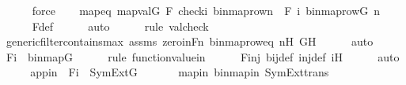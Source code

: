 \begin{isabellebody}
\ \ \ \ \isamarkupfalse%
\ force\isanewline
\isanewline
\ \ \isamarkupfalse%
\ mapeq{\isacharcolon}{\kern0pt}\ {\isachardoublequoteopen}map{\isacharparenleft}{\kern0pt}val{\isacharparenleft}{\kern0pt}G{\isacharparenright}{\kern0pt}{\isacharcomma}{\kern0pt}\ {\isacharbrackleft}{\kern0pt}F{\isacharprime}{\kern0pt}{\isacharcomma}{\kern0pt}\ check{\isacharparenleft}{\kern0pt}i{\isacharparenright}{\kern0pt}{\isacharcomma}{\kern0pt}\ binmap{\isacharunderscore}{\kern0pt}row{\isacharprime}{\kern0pt}{\isacharparenleft}{\kern0pt}n{\isacharparenright}{\kern0pt}{\isacharbrackright}{\kern0pt}{\isacharparenright}{\kern0pt}\ {\isacharequal}{\kern0pt}\ {\isacharbrackleft}{\kern0pt}F{\isacharcomma}{\kern0pt}\ i{\isacharcomma}{\kern0pt}\ binmap{\isacharunderscore}{\kern0pt}row{\isacharparenleft}{\kern0pt}G{\isacharcomma}{\kern0pt}\ n{\isacharparenright}{\kern0pt}{\isacharbrackright}{\kern0pt}{\isachardoublequoteclose}\isanewline
\ \ \ \ \isamarkupfalse%
\ F{\isacharunderscore}{\kern0pt}def\isanewline
\ \ \ \ \isamarkupfalse%
\ auto\isanewline
\ \ \ \ \ \isamarkupfalse%
{\isacharparenleft}{\kern0pt}rule\ valcheck{\isacharparenright}{\kern0pt}\isanewline
\ \ \ \ \isamarkupfalse%
\ generic{\isacharunderscore}{\kern0pt}filter{\isacharunderscore}{\kern0pt}contains{\isacharunderscore}{\kern0pt}max\ assms\ zero{\isacharunderscore}{\kern0pt}in{\isacharunderscore}{\kern0pt}Fn\ binmap{\isacharunderscore}{\kern0pt}row{\isacharunderscore}{\kern0pt}eq\ nH\ GH\isanewline
\ \ \ \ \isamarkupfalse%
\ auto\isanewline
\isanewline
\ \ \isamarkupfalse%
\ {\isachardoublequoteopen}F{\isacharbackquote}{\kern0pt}i\ {\isasymin}\ binmap{\isacharparenleft}{\kern0pt}G{\isacharparenright}{\kern0pt}{\isachardoublequoteclose}\ \isanewline
\ \ \ \ \isamarkupfalse%
{\isacharparenleft}{\kern0pt}rule\ function{\isacharunderscore}{\kern0pt}value{\isacharunderscore}{\kern0pt}in{\isacharparenright}{\kern0pt}\isanewline
\ \ \ \ \isamarkupfalse%
\ Finj\ bij{\isacharunderscore}{\kern0pt}def\ inj{\isacharunderscore}{\kern0pt}def\ iH\isanewline
\ \ \ \ \isamarkupfalse%
\ auto\isanewline
\ \ \isamarkupfalse%
\ \isamarkupfalse%
\ appin\ {\isacharcolon}{\kern0pt}\ {\isachardoublequoteopen}F{\isacharbackquote}{\kern0pt}i\ {\isasymin}\ SymExt{\isacharparenleft}{\kern0pt}G{\isacharparenright}{\kern0pt}{\isachardoublequoteclose}\ \isanewline
\ \ \ \ \isamarkupfalse%
\ mapin\ binmapin\ SymExt{\isacharunderscore}{\kern0pt}trans\isanewline

\end{isabellebody}
